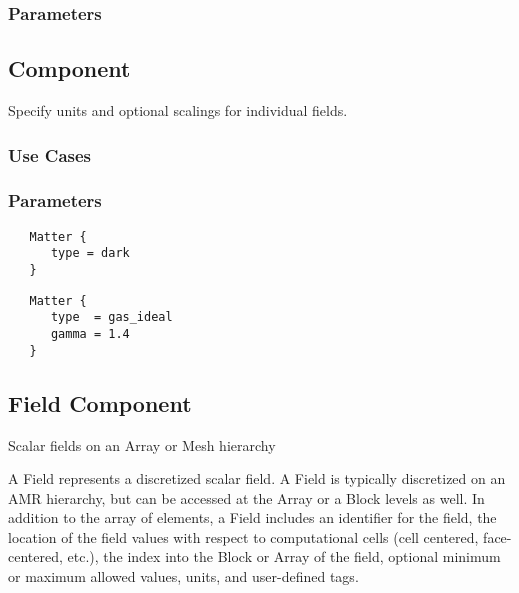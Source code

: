 \subsubsection{Parameters}

\subsection{ Component} \label{ss:component-matter}

 Specify units and optional scalings for individual
 fields.  

\subsubsection{Use Cases}

\subsubsection{Parameters}

\begin{verbatim}
   Matter {
      type = dark
   }
\end{verbatim}

\begin{verbatim}
   Matter {
      type  = gas_ideal
      gamma = 1.4
   }
\end{verbatim}


\subsection{ Field  Component}
Scalar fields on an Array or Mesh hierarchy

A Field represents a discretized scalar field. A Field is typically
discretized on an AMR hierarchy, but can be accessed at the Array or a
Block levels as well. In addition to the array of elements, a Field
includes an identifier for the field, the location of the field values
with respect to computational cells (cell centered, face-centered,
etc.), the index into the Block or Array of the field, optional
minimum or maximum allowed values, units, and user-defined tags.

